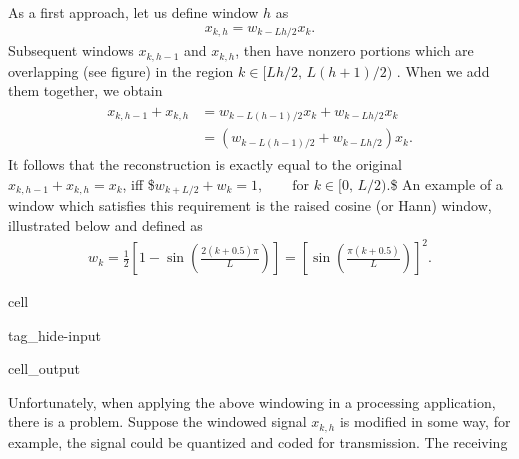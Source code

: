 \documentclass[letterpaper,10pt,english]{jupyterBook}
\begin{document}
\sphinxAtStartPar
As a first approach, let us define window \(h\) as
\begin{equation*}
\begin{split} x_{k,h} = w_{k-Lh/2} x_k. \end{split}
\end{equation*}
\sphinxAtStartPar
Subsequent windows \(x_{k,h-1}\) and \(x_{k,h}\), then have
non\sphinxhyphen{}zero portions which are overlapping (see figure) in
the region \( k\in[Lh/2,\, L(h+1)/2) \) . When we add them
together, we obtain
\begin{equation*}
\begin{split} \begin{split} x_{k,h-1} + x_{k,h} &= w_{k-L(h-1)/2} x_k +
w_{k-Lh/2} x_k \\&= \left(w_{k-L(h-1)/2} + w_{k-Lh/2}\right) x_k.
\end{split} \end{split}
\end{equation*}
\sphinxAtStartPar
It follows that the reconstruction is exactly equal to the
original \(x_{k,h-1} + x_{k,h}=x_k\), iff
\$\( w_{k+L/2} + w_{k} = 1,\qquad\text{for } k\in[0,\,L/2). \)\$
An example of a window which satisfies this requirement is the raised
cosine (or Hann) window, illustrated below and defined as
\begin{equation*}
\begin{split} w_k = \frac12\left[1-\sin\left(\frac{ 2(k+0.5)\pi
}L\right)\right] =
\left[\sin\left(\frac{\pi(k+0.5)}L\right)\right]^2. \end{split}
\end{equation*}
\begin{sphinxuseclass}{cell}
\begin{sphinxuseclass}{tag_hide-input}\begin{sphinxVerbatimOutput}

\begin{sphinxuseclass}{cell_output}
\noindent{}

\end{sphinxuseclass}\end{sphinxVerbatimOutput}

\end{sphinxuseclass}
\end{sphinxuseclass}
\sphinxAtStartPar
Unfortunately, when applying the above windowing in a processing
application, there is a problem. Suppose the windowed
signal \(x_{k,h}\) is modified in some way, for example, the
signal could be quantized and coded for transmission. The receiving
\end{document}
